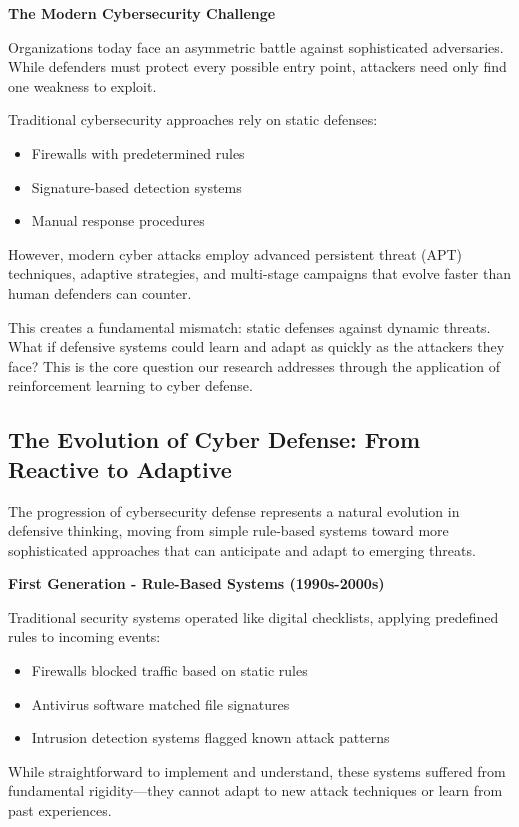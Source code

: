 \documentclass[12pt,oneside,a4paper]{article}
\theoremstyle{definition}
\theoremstyle{plain}
\begin{document}
\textbf{The Modern Cybersecurity Challenge}

Organizations today face an asymmetric battle against sophisticated adversaries. While defenders must protect every possible entry point, attackers need only find one weakness to exploit. 

Traditional cybersecurity approaches rely on static defenses:
\begin{itemize}
    \item Firewalls with predetermined rules
    \item Signature-based detection systems  
    \item Manual response procedures
\end{itemize}

However, modern cyber attacks employ advanced persistent threat (APT) techniques, adaptive strategies, and multi-stage campaigns that evolve faster than human defenders can counter.

This creates a fundamental mismatch: static defenses against dynamic threats. What if defensive systems could learn and adapt as quickly as the attackers they face? This is the core question our research addresses through the application of reinforcement learning to cyber defense.

\subsection{The Evolution of Cyber Defense: From Reactive to Adaptive}

The progression of cybersecurity defense represents a natural evolution in defensive thinking, moving from simple rule-based systems toward more sophisticated approaches that can anticipate and adapt to emerging threats.

\textbf{First Generation - Rule-Based Systems (1990s-2000s)}

Traditional security systems operated like digital checklists, applying predefined rules to incoming events:
\begin{itemize}
    \item Firewalls blocked traffic based on static rules
    \item Antivirus software matched file signatures
    \item Intrusion detection systems flagged known attack patterns
\end{itemize}

While straightforward to implement and understand, these systems suffered from fundamental rigidity—they cannot adapt to new attack techniques or learn from past experiences.
\end{document}

